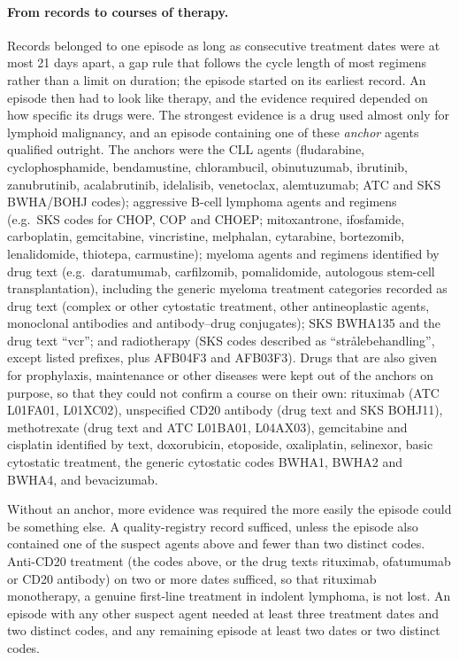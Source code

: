 \documentclass[10pt]{article}
\begin{document}
\paragraph{From records to courses of therapy.} Records belonged to one episode
as long as consecutive treatment dates were at most 21 days apart, a gap rule
that follows the cycle length of most regimens rather than a limit on duration;
the episode started on its earliest record. An episode then had to look like
therapy, and the evidence required depended on how specific its drugs were. The
strongest evidence is a drug used almost only for lymphoid malignancy, and an
episode containing one of these \emph{anchor} agents qualified outright. The
anchors were the CLL agents (fludarabine, cyclophosphamide, bendamustine,
chlorambucil, obinutuzumab, ibrutinib, zanubrutinib, acalabrutinib, idelalisib,
venetoclax, alemtuzumab; ATC and SKS BWHA/BOHJ codes); aggressive B-cell
lymphoma agents and regimens (e.g.\ SKS codes for CHOP, COP and CHOEP;
mitoxantrone, ifosfamide, carboplatin, gemcitabine, vincristine, melphalan,
cytarabine, bortezomib, lenalidomide, thiotepa, carmustine); myeloma agents and
regimens identified by drug text (e.g.\ daratumumab, carfilzomib, pomalidomide,
autologous stem-cell transplantation), including the generic myeloma treatment
categories recorded as drug text (complex or other cytostatic treatment, other
antineoplastic agents, monoclonal antibodies and antibody--drug conjugates);
SKS BWHA135 and the drug text ``vcr''; and radiotherapy (SKS codes described as
``strålebehandling'', except listed prefixes, plus AFB04F3 and AFB03F3). Drugs
that are also given for prophylaxis, maintenance or other diseases were kept out
of the anchors on purpose, so that they could not confirm a course on their own:
rituximab (ATC L01FA01, L01XC02), unspecified CD20 antibody (drug text and SKS
BOHJ11), methotrexate (drug text and ATC L01BA01, L04AX03), gemcitabine and
cisplatin identified by text, doxorubicin, etoposide, oxaliplatin, selinexor,
basic cytostatic treatment, the generic cytostatic codes BWHA1, BWHA2 and BWHA4,
and bevacizumab.

Without an anchor, more evidence was required the more easily the episode could
be something else. A quality-registry record sufficed, unless the episode also
contained one of the suspect agents above and fewer than two distinct codes.
Anti-CD20 treatment (the codes above, or the drug texts rituximab, ofatumumab or
CD20 antibody) on two or more dates sufficed, so that rituximab monotherapy, a
genuine first-line treatment in indolent lymphoma, is not lost. An episode with
any other suspect agent needed at least three treatment dates and two distinct
codes, and any remaining episode at least two dates or two distinct codes.
\end{document}
